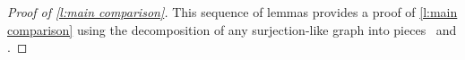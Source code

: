 %

\begin{proof}[Proof of \cref{l:main comparison}]
	This sequence of lemmas provides a proof of \cref{l:main comparison} using the decomposition of any surjection-like graph into pieces \coproduct \ and \product.
\end{proof}